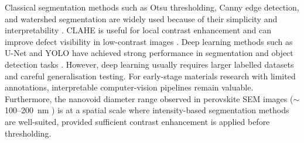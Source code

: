 \documentclass[pdflatex,sn-mathphys-num,iicol]{sn-jnl}
\theoremstyle{thmstyleone}
\theoremstyle{thmstyletwo}
\theoremstyle{thmstylethree}
\begin{document}
Classical segmentation methods such as Otsu thresholding, Canny edge
detection, and watershed segmentation are widely used because of
their simplicity and interpretability
\cite{otsu1979,canny1986,vincent1991}. CLAHE is useful for local
contrast enhancement and can improve defect visibility in
low-contrast images \cite{zuiderveld1994}. Deep learning methods such
as U-Net and YOLO have achieved strong performance in segmentation
and object detection tasks \cite{ronneberger2015,redmon2016}.
However, deep learning usually requires larger labelled datasets and
careful generalisation testing. For early-stage materials research
with limited annotations, interpretable computer-vision pipelines
remain valuable. Furthermore, the nanovoid diameter range observed
in perovskite SEM images ($\sim$100--200~nm \cite{chang2026}) is at
a spatial scale where intensity-based segmentation methods are
well-suited, provided sufficient contrast enhancement is applied
before thresholding.

\end{document}
